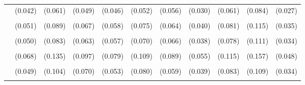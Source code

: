 \documentclass[3p, authoryear, review]{elsarticle} %
\begin{document}
\begin{landscape}
\begin{table}
{\begin{tabular}[t]{lcccccccccc}
 & (0.042) & (0.061) & (0.049) & (0.046) & (0.052) & (0.056) & (0.030) & (0.061) & (0.084) & (0.027)\\
\cellcolor{gray!6}{Basketball} & \cellcolor{gray!6}{-0.137***} & \cellcolor{gray!6}{-0.242***} & \cellcolor{gray!6}{-0.399***} & \cellcolor{gray!6}{-0.385***} & \cellcolor{gray!6}{-0.313***} & \cellcolor{gray!6}{-0.163**} & \cellcolor{gray!6}{-0.307***} & \cellcolor{gray!6}{-0.297***} & \cellcolor{gray!6}{-0.307***} & \cellcolor{gray!6}{-0.265***}\\
 & (0.051) & (0.089) & (0.067) & (0.058) & (0.075) & (0.064) & (0.040) & (0.081) & (0.115) & (0.035)\\
\cellcolor{gray!6}{Baseball} & \cellcolor{gray!6}{0.043} & \cellcolor{gray!6}{0.097} & \cellcolor{gray!6}{0.094} & \cellcolor{gray!6}{0.045} & \cellcolor{gray!6}{0.041} & \cellcolor{gray!6}{-0.165**} & \cellcolor{gray!6}{0.162***} & \cellcolor{gray!6}{0.048} & \cellcolor{gray!6}{0.055} & \cellcolor{gray!6}{0.064*}\\
 & (0.050) & (0.083) & (0.063) & (0.057) & (0.070) & (0.066) & (0.038) & (0.078) & (0.111) & (0.034)\\
\cellcolor{gray!6}{Football / Soccer} & \cellcolor{gray!6}{-0.359***} & \cellcolor{gray!6}{-0.957***} & \cellcolor{gray!6}{-0.557***} & \cellcolor{gray!6}{-0.601***} & \cellcolor{gray!6}{-0.947***} & \cellcolor{gray!6}{-0.221**} & \cellcolor{gray!6}{-0.530***} & \cellcolor{gray!6}{-0.425***} & \cellcolor{gray!6}{-0.900***} & \cellcolor{gray!6}{-0.496***}\\
 & (0.068) & (0.135) & (0.097) & (0.079) & (0.109) & (0.089) & (0.055) & (0.115) & (0.157) & (0.048)\\
\cellcolor{gray!6}{Tennis} & \cellcolor{gray!6}{0.449***} & \cellcolor{gray!6}{-0.535***} & \cellcolor{gray!6}{-0.060} & \cellcolor{gray!6}{0.436***} & \cellcolor{gray!6}{-0.202**} & \cellcolor{gray!6}{0.658***} & \cellcolor{gray!6}{0.188***} & \cellcolor{gray!6}{0.062} & \cellcolor{gray!6}{0.325***} & \cellcolor{gray!6}{0.261***}\\
 & (0.049) & (0.104) & (0.070) & (0.053) & (0.080) & (0.059) & (0.039) & (0.083) & (0.109) & (0.034)\\
\cellcolor{gray!6}{Volleyball} & \cellcolor{gray!6}{0.575***} & \cellcolor{gray!6}{0.211} & \cellcolor{gray!6}{0.680***} & \cellcolor{gray!6}{0.337***} & \cellcolor{gray!6}{0.160} & \cellcolor{gray!6}{0.500***} & \cellcolor{gray!6}{0.567***} & \cellcolor{gray!6}{0.864***} & \cellcolor{gray!6}{0.174} & \cellcolor{gray!6}{0.573***}\\

\end{tabular}}
\end{table}
\end{landscape}
\end{document}
